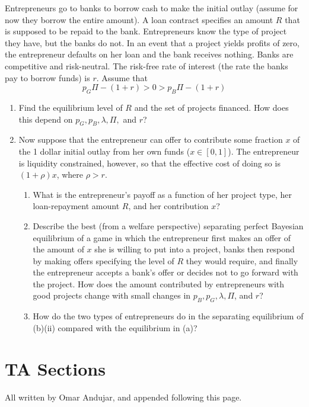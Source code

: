 \documentclass[12pt]{article}
\begin{document}
\begin{enumerate}
	Entrepreneurs go to banks to borrow cash to make the initial outlay (assume for now they borrow the entire amount). A loan contract specifies an amount $R$ that is supposed to be repaid to the bank. Entrepreneurs know the type of project they have, but the banks do not. In an event that a project yields profits of zero, the entrepreneur defaults on her loan and the bank receives nothing. Banks are competitive and risk-neutral. The risk-free rate of interest (the rate the banks pay to borrow funds) is $r$. Assume that
	\[
	p_G \Pi - (1 + r) > 0 > p_B \Pi - (1 + r)
	\]
	\begin{enumerate}
		\item Find the equilibrium level of $R$ and the set of projects financed. How does this depend on $p_G,p_B,\lambda,\Pi,$ and $r$?
		\item Now suppose that the entrepreneur can offer to contribute some fraction $x$ of the 1 dollar initial outlay from her own funds ($x \in [0,1]$). The entrepreneur is liquidity constrained, however, so that the effective cost of doing so is $(1 + \rho)x$, where $\rho > r$.
		\begin{enumerate}
			\item What is the entrepreneur's payoff as a function of her project type, her loan-repayment amount $R$, and her contribution $x$?
			\item Describe the best (from a welfare perspective) separating perfect Bayesian equilibrium of a game in which the entrepreneur first makes an offer of the amount of $x$ she is willing to put into a project, banks then respond by making offers specifying the level of $R$ they would require, and finally the entrepreneur accepts a bank's offer or decides not to go forward with the project. How does the amount contributed by entrepreneurs with good projects change with small changes in $p_B,p_G,\lambda,\Pi$, and $r$?
			\item How do the two types of entrepreneurs do in the separating equilibrium of (b)(ii) compared with the equilibrium in (a)?
		\end{enumerate}
	\end{enumerate}
\end{enumerate}



\section{TA Sections}

All written by Omar Andujar, and appended following this page.
\end{document}
